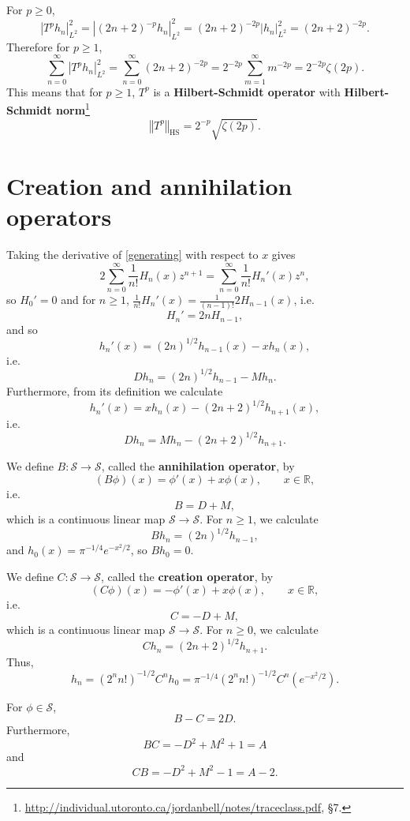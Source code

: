 \documentclass{article}
\newcommand{\HS}[1]{\left\Vert #1 \right\Vert_{\mathrm{HS}}}
\theoremstyle{definition}
\begin{document}
For $p \geq 0$, 
\[
|T^p h_n|_{L^2}^2= |(2n+2)^{-p}h_n|_{L^2}^2
=(2n+2)^{-2p} |h_n|_{L^2}^2
=(2n+2)^{-2p}.
\]
Therefore for $p \geq 1$,
\[
\sum_{n=0}^\infty |T^p h_n|_{L^2}^2 
=\sum_{n=0}^\infty (2n+2)^{-2p}
=2^{-2p} \sum_{m=1}^\infty m^{-2p}
=2^{-2p} \zeta(2p).
\]
This means that for $p \geq 1$, $T^p$ is a \textbf{Hilbert-Schmidt operator} with \textbf{Hilbert-Schmidt norm}\footnote{\url{http://individual.utoronto.ca/jordanbell/notes/traceclass.pdf},
\S 7.}
\[
\HS{T^p} = 2^{-p} \sqrt{\zeta(2p)}.
\]



\section{Creation and annihilation operators}
Taking the derivative of \eqref{generating} with respect to $x$ gives
\[
2\sum_{n=0}^\infty \frac{1}{n!} H_n(x) z^{n+1} = \sum_{n=0}^\infty \frac{1}{n!} H_n'(x) z^n,
\]
so $H_0'=0$ and for $n \geq 1$, $\frac{1}{n!} H_n'(x) = \frac{1}{(n-1)!} 2H_{n-1}(x)$, i.e.
\[
H_n' = 2nH_{n-1},
\]
and so
\[
h_n'(x) = (2n)^{1/2} h_{n-1}(x)-xh_n(x),
\]
i.e.
\[
Dh_n=(2n)^{1/2}h_{n-1}-Mh_n.
\]
Furthermore, from its definition we calculate
\[
h_n'(x) = xh_n(x)-(2n+2)^{1/2} h_{n+1}(x),
\]
i.e.
\[
Dh_n=Mh_n-(2n+2)^{1/2}h_{n+1}.
\]


We define $B:\mathscr{S} \to \mathscr{S}$, called the \textbf{annihilation operator}, by
\[
(B\phi)(x) = \phi'(x)+x\phi(x),\qquad x \in \mathbb{R},
\]
i.e.
\[
B = D+M,
\]
which is a continuous linear map $\mathscr{S} \to \mathscr{S}$.
For $n \geq 1$, we calculate
\[
Bh_n = (2n)^{1/2} h_{n-1},
\]
and $h_0(x)=\pi^{-1/4} e^{-x^2/2}$, so $Bh_0=0$. 



We define $C:\mathscr{S} \to \mathscr{S}$, called the \textbf{creation operator}, by
\[
(C\phi)(x) = -\phi'(x)+x\phi(x),\qquad x \in \mathbb{R},
\]
i.e.
\[
C = -D+M,
\]
which is a continuous linear map $\mathscr{S} \to \mathscr{S}$.
For $n \geq 0$, we calculate
\[
Ch_n = (2n+2)^{1/2}h_{n+1}.
\]
Thus,
\begin{equation}
h_n=(2^nn!)^{-1/2} C^n h_0 =\pi^{-1/4} (2^nn!)^{-1/2} C^n (e^{-x^2/2}).
\label{creation}
\end{equation}

For $\phi \in \mathscr{S}$,
\[
B-C=2D.
\]
Furthermore,
\[
BC = -D^2+M^2+1=A
\]
and
\[
CB = -D^2+M^2-1=A-2.
\]
\end{document}
